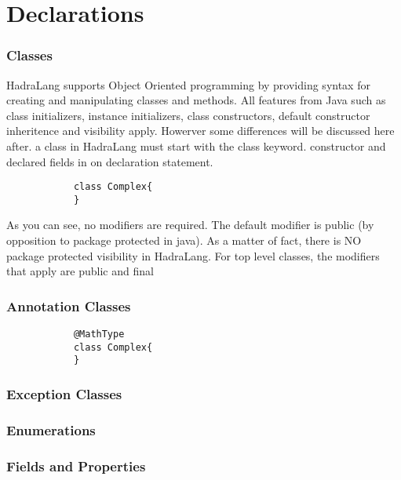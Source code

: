 \documentclass{tufte-book}
\begin{document}
            \chapter{Declarations}
            \subsection{Classes}
            HadraLang supports Object Oriented programming by providing syntax for creating and manipulating classes and methods. All features from Java such as class initializers, instance initializers, class constructors, default constructor inheritence and visibility apply. Howerver some differences will be discussed here after.
            a class in HadraLang must start with the class keyword.
            constructor and  declared fields in on declaration statement.

            \begin{lstlisting}
            class Complex{
            }
            \end{lstlisting}


            As you can see, no modifiers are required. The default modifier is \textcolor{keyword1}{public}  (by opposition to package protected in java). As a matter of fact, there is NO package protected visibility in HadraLang. For top level classes, the modifiers that apply are public and final


            \subsection{Annotation Classes}
            \begin{lstlisting}
            @MathType
            class Complex{
            }
            \end{lstlisting}



            \subsection{Exception Classes}
            \subsection{Enumerations}



            \subsection{Fields and Properties}
\end{document}
